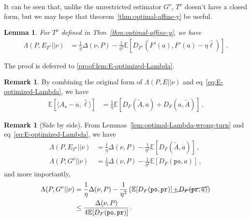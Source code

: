 \documentclass{article}
\theoremstyle{plain}
\newtheorem{lemma}[theorem]{Lemma}
\theoremstyle{definition}
\newtheorem{remark}[theorem]{Remark}
\newcommand{\pr}{\texttt{pr}}
\newcommand{\po}{\texttt{po}}
\newcommand{\E}{\mathbb E}
\newcommand{\hl}{\hat{\ell}\xspace}
\begin{document}
It can be seen that, unlike the unrestricted estimator $G^\nu$,
$T^\nu$ doesn't have a closed form,
but we may hope that theorem~\ref{thm:optimal-affine-y} be useful.
\begin{lemma}
    \label{lem:E-optimized-Lambda}
    For $T^\nu$ defined in Thm~\ref{thm:optimal-affine-y}, we have
    \begin{align}
        \Lambda(P, E_{T^\nu} || \nu)
         & = \frac{1}{\eta}
        \Delta(\nu, P) -
        \frac{1}{\eta^2}
        \E\!\left[
            D_{F^\star}\left(F'(a), F'(a) - \eta \hl\right)
            \right]\,.
        \label{eq:E-optimized-Lambda}
    \end{align}
\end{lemma}
\noindent The proof is deferred to \ref{proof:lem:E-optimized-Lambda}.

\begin{remark}
    By combining the original form of $\Lambda(P, E || \nu)$
    and eq~\ref{eq:E-optimized-Lambda}, we have
    \begin{align*}
        \E\!\left[
            \langle A_\star - a, \hl \rangle
            \right]
         & =
        \frac{1}{\eta}
        \E\!\left[
            D_F(\tilde{A}, a)
            +
            D_F(a, \tilde{A})
            \right]\,.
    \end{align*}
\end{remark}

\begin{remark}[Side by side]
    \label{rem:posterior-tildeA}
    From Lemmas~\ref{lem:optimal-Lambda-wrong-turn}
    and eq~\ref{eq:E-optimized-Lambda}, we have
    \begin{align}
        \Lambda(P, E_{T^\nu} || \nu)
         & = \frac{1}{\eta} \Delta(\nu, P)
        - \frac{1}{\eta^2}
        \E\!\left[
            D_F(\tilde{A}, a)
            \right]
        \tag{affine-$Y$}\,,
        \label{eq:Lambda-affine-Y}         \\
        \Lambda(P, G^\nu|| \nu)
         & =
        \frac{1}{\eta} \Delta(\nu, P)
        - \frac{1}{\eta^2}
        \E\!\left[D_F(\po, a)\right]\,,
        \tag{unrestricted}
        \label{eq:Lambda-unrestricted}
    \end{align}
    and more importantly,
    \begin{align*}
        \Lambda(P, G^\nu|| \nu)
         & =
        \frac{1}{\eta} \Delta(\nu, P)
        - \frac{1}{\eta^2}
        \left(
        \E\!\left[D_F(\po, \pr)\right]
        \cancel{+ D_F(\pr, a)}
        \right) \\
         & \leq
        \frac{\Delta(\nu, P)}{4
            \E\!\left[D_F(\po, \pr)\right]}
        \,.
    \end{align*}
\end{remark}
\end{document}
